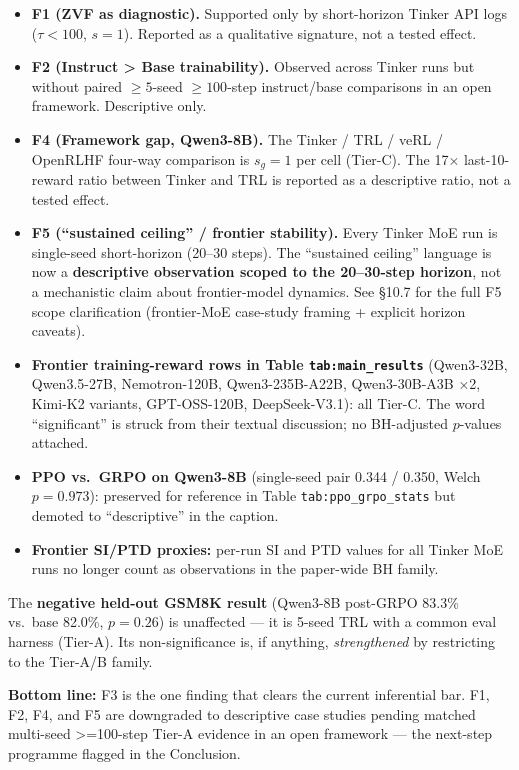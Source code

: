 \documentclass[
  american,
  11pt,
  a4paper,
  oneside]{report}
\providecommand{\tightlist}{%
  \setlength{\itemsep}{0pt}\setlength{\parskip}{0pt}}
\begin{document}
\begin{itemize}
\tightlist
\item
  \textbf{F1 (ZVF as diagnostic).} Supported only by short-horizon
  Tinker API logs (\(\tau < 100\), \(s = 1\)). Reported as a qualitative
  signature, not a tested effect.
\item
  \textbf{F2 (Instruct \textgreater{} Base trainability).} Observed
  across Tinker runs but without paired \(\ge 5\)-seed \(\ge 100\)-step
  instruct/base comparisons in an open framework. Descriptive only.
\item
  \textbf{F4 (Framework gap, Qwen3-8B).} The Tinker / TRL / veRL /
  OpenRLHF four-way comparison is \(s_g = 1\) per cell (Tier-C). The 17×
  last-10-reward ratio between Tinker and TRL is reported as a
  descriptive ratio, not a tested effect.
\item
  \textbf{F5 (``sustained ceiling'' / frontier stability).} Every Tinker
  MoE run is single-seed short-horizon (20--30 steps). The ``sustained
  ceiling'' language is now a \textbf{descriptive observation scoped to
  the 20--30-step horizon}, not a mechanistic claim about frontier-model
  dynamics. See §10.7 for the full F5 scope clarification (frontier-MoE
  case-study framing + explicit horizon caveats).
\item
  \textbf{Frontier training-reward rows in Table
  \texttt{tab:main\_results}} (Qwen3-32B, Qwen3.5-27B, Nemotron-120B,
  Qwen3-235B-A22B, Qwen3-30B-A3B ×2, Kimi-K2 variants, GPT-OSS-120B,
  DeepSeek-V3.1): all Tier-C. The word ``significant'' is struck from
  their textual discussion; no BH-adjusted \(p\)-values attached.
\item
  \textbf{PPO vs.~GRPO on Qwen3-8B} (single-seed pair 0.344 / 0.350,
  Welch \(p = 0.973\)): preserved for reference in Table
  \texttt{tab:ppo\_grpo\_stats} but demoted to ``descriptive'' in the
  caption.
\item
  \textbf{Frontier SI/PTD proxies:} per-run SI and PTD values for all
  Tinker MoE runs no longer count as observations in the paper-wide BH
  family.
\end{itemize}

The \textbf{negative held-out GSM8K result} (Qwen3-8B post-GRPO 83.3\%
vs.~base 82.0\%, \(p = 0.26\)) is unaffected --- it is 5-seed TRL with a
common eval harness (Tier-A). Its non-significance is, if anything,
\emph{strengthened} by restricting to the Tier-A/B family.

\textbf{Bottom line:} F3 is the one finding that clears the current
inferential bar. F1, F2, F4, and F5 are downgraded to descriptive case
studies pending matched multi-seed \textgreater=100-step Tier-A evidence
in an open framework --- the next-step programme flagged in the
Conclusion.
\end{document}
